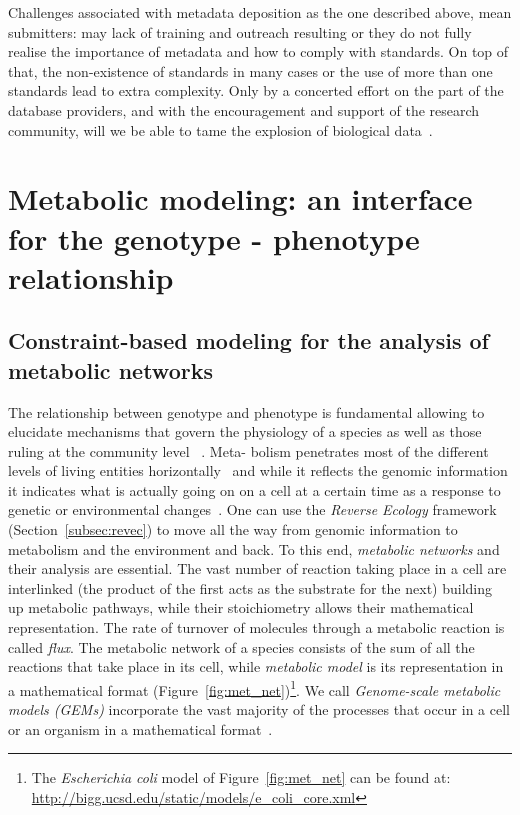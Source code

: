       Challenges associated with metadata deposition 
      as the one described above,
      mean submitters: 
      may lack of training and outreach resulting 
      or they do not fully realise the importance of metadata and 
      how to comply with standards.
      On top of that, the non-existence of standards in many cases 
      or the use of more than one standards lead to extra complexity.
      Only by a concerted effort on the part of the database providers, and with the encouragement and support of the research community, will we be able to tame the explosion of biological data~\citep{stein2003integrating}.
\section{Metabolic modeling: an interface for the genotype - phenotype relationship}


   \subsection{Constraint-based modeling for the analysis of metabolic networks}
   \label{subesec:modling}

      The relationship between genotype and phenotype is fundamental allowing to elucidate 
      mechanisms that govern the physiology of a species as well as those 
      ruling at the community level
      ~\citep{morris2020linking}.
      Meta-
      bolism penetrates most of the different levels of living entities horizontally~\citep{schramski2015metabolic} and 
      while it reflects the genomic information it indicates 
      what is actually going on on a cell at a certain time
      as a response to genetic or environmental changes~\citep{lima2021role}.
      One can use the \textit{Reverse Ecology} framework (Section~\ref{subsec:revec})
      to move all the way from genomic information to metabolism and the environment and back.
      To this end, \textit{metabolic networks} and their analysis are essential. 
      The vast number of reaction taking place in a cell are interlinked 
      (the product of the first acts as the substrate for the next) 
      building up metabolic pathways,
      while their stoichiometry allows their mathematical representation. 
      The rate of turnover of molecules through a metabolic reaction is called \textit{flux}.
      The metabolic network of a species consists of the sum of all the reactions that 
      take place in its cell,
      while \textit{metabolic model} is its representation in a mathematical format (Figure~\ref{fig:met_net})\footnote{               
         The \textit{Escherichia coli} model of Figure~\ref{fig:met_net} can be found at:\\
            \href{http://bigg.ucsd.edu/static/models/e_coli_core.xml}{http://bigg.ucsd.edu/static/models/e\_coli\_core.xml}
      }. 
      We call \textit{Genome-scale metabolic models (GEMs)} incorporate the vast majority of the 
      processes that occur in a cell or an organism in a mathematical format~\citep{feist2009reconstruction}.



